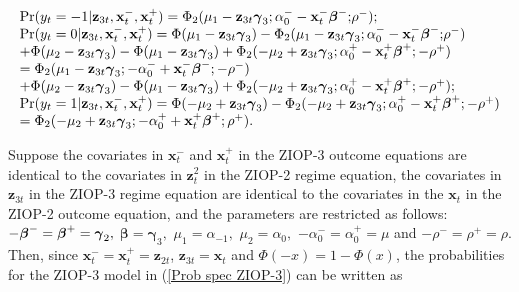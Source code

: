 \documentclass[letterpaper,fleqn,12pt]{article}
\begin{document}
\begin{onehalfspace}
\begin{flushleft}
\begin{equation}
\begin{array}{l}
\Pr (y_{t}=-1|\mathbf{z}_{3t},\mathbf{x}_{t}^{-},\mathbf{x}_{t}^{+})=\Phi
_{2}(\mu _{1}-\mathbf{z}_{3t}\mathbf{\gamma }_{3};\alpha _{0}^{-}-\mathbf{x}%
_{t}^{-}\mathbf{\beta }^{-}\mathbf{;}\rho ^{-}); \\ 
\Pr (y_{t}=0|\mathbf{z}_{3t},\mathbf{x}_{t}^{-},\mathbf{x}_{t}^{+})=\Phi
(\mu _{1}-\mathbf{z}_{3t}\mathbf{\gamma }_{3})-\Phi _{2}(\mu _{1}-\mathbf{z}%
_{3t}\mathbf{\gamma }_{3};\alpha _{0}^{-}-\mathbf{x}_{t}^{-}\mathbf{\beta }%
^{-}\mathbf{;}\rho ^{-}) \\ 
+\Phi (\mu _{2}-\mathbf{z}_{3t}\mathbf{\gamma }_{3})-\Phi (\mu _{1}-\mathbf{z%
}_{3t}\mathbf{\gamma }_{3})+\Phi _{2}(-\mu _{2}+\mathbf{z}_{3t}\mathbf{%
\gamma }_{3};\alpha _{0}^{+}-\mathbf{x}_{t}^{+}\mathbf{\beta }^{+};\mathbf{-}%
\rho ^{+}) \\ 
=\Phi _{2}(\mu _{1}-\mathbf{z}_{3t}\mathbf{\gamma }_{3};-\alpha _{0}^{-}+%
\mathbf{x}_{t}^{-}\mathbf{\beta }^{-}\mathbf{;-}\rho ^{-}) \\ 
+\Phi (\mu _{2}-\mathbf{z}_{3t}\mathbf{\gamma }_{3})-\Phi (\mu _{1}-\mathbf{z%
}_{3t}\mathbf{\gamma }_{3})+\Phi _{2}(-\mu _{2}+\mathbf{z}_{3t}\mathbf{%
\gamma }_{3};\alpha _{0}^{+}-\mathbf{x}_{t}^{+}\mathbf{\beta }^{+};\mathbf{-}%
\rho ^{+}); \\ 
\Pr (y_{t}=1|\mathbf{z}_{3t},\mathbf{x}_{t}^{-},\mathbf{x}_{t}^{+})=\Phi
(-\mu _{2}+\mathbf{z}_{3t}\mathbf{\gamma }_{3})-\Phi _{2}(-\mu _{2}+\mathbf{z%
}_{3t}\mathbf{\gamma }_{3};\alpha _{0}^{+}-\mathbf{x}_{t}^{+}\mathbf{\beta }%
^{+};\mathbf{-}\rho ^{+}) \\ 
=\Phi _{2}(-\mu _{2}+\mathbf{z}_{3t}\mathbf{\gamma }_{3};-\alpha _{0}^{+}+%
\mathbf{x}_{t}^{+}\mathbf{\beta }^{+};\rho ^{+}).%
\end{array}
\label{Prob spec ZIOP-3}
\end{equation}
\end{flushleft}

Suppose the covariates in $\mathbf{x}_{t}^{-}$ and $\mathbf{x}_{t}^{+}$ in
the ZIOP-3 outcome equations are identical to the covariates in $\mathbf{z}%
_{t}^{2}$ in the ZIOP-2 regime equation, the covariates in $\mathbf{z}_{3t}$
in the ZIOP-3 regime equation are identical to the covariates in the $%
\mathbf{x}_{t}$ in the ZIOP-2 outcome equation, and the parameters are
restricted as follows: $-\mathbf{\beta }^{-}=\mathbf{\beta }^{+}=\mathbf{%
\gamma }_{2},$ $\mathbf{\beta }=\mathbf{\gamma }_{3},$ $\mu _{1}=\alpha
_{-1},$ $\mu _{2}=\alpha _{0},$ $-\alpha _{0}^{-}=\alpha _{0}^{+}=\mu $ and $%
-\rho ^{-}=\rho ^{+}=\rho $. Then, since $\mathbf{x}_{t}^{-}=\mathbf{x}%
_{t}^{+}=\mathbf{z}_{2t}$, $\mathbf{z}_{3t}=\mathbf{x}_{t}$ and $\Phi
(-x)=1-\Phi (x)$, the probabilities for the ZIOP-3 model in (\ref{Prob spec
ZIOP-3}) can be written as


\end{onehalfspace}
\end{document}
